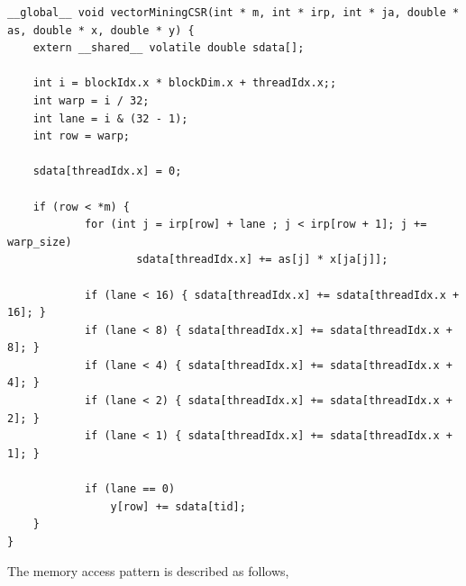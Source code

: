 \documentclass[12pt]{article}
\begin{document}
\begin{lstlisting}
__global__ void vectorMiningCSR(int * m, int * irp, int * ja, double * as, double * x, double * y) {
	extern __shared__ volatile double sdata[];
	
	int i = blockIdx.x * blockDim.x + threadIdx.x;;
	int warp = i / 32; 
	int lane = i & (32 - 1); 
	int row = warp;

	sdata[threadIdx.x] = 0;

	if (row < *m) {
			for (int j = irp[row] + lane ; j < irp[row + 1]; j += warp_size)
					sdata[threadIdx.x] += as[j] * x[ja[j]];

			if (lane < 16) { sdata[threadIdx.x] += sdata[threadIdx.x + 16]; }
			if (lane < 8) { sdata[threadIdx.x] += sdata[threadIdx.x + 8]; }
			if (lane < 4) { sdata[threadIdx.x] += sdata[threadIdx.x + 4]; }
			if (lane < 2) { sdata[threadIdx.x] += sdata[threadIdx.x + 2]; }
			if (lane < 1) { sdata[threadIdx.x] += sdata[threadIdx.x + 1]; }

			if (lane == 0)
				y[row] += sdata[tid];
	}
}
\end{lstlisting}

\par The memory access pattern is described as follows, 
\end{document}
